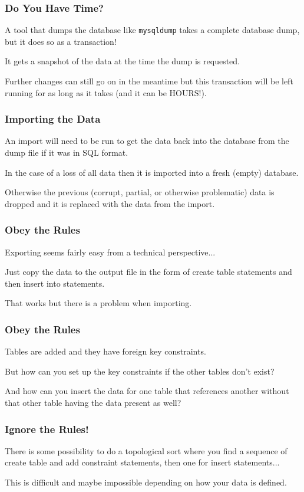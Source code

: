 \begin{frame}
\frametitle{Do You Have Time?}

A tool that dumps the database like \texttt{mysqldump} takes a complete database dump, but it does so as a transaction! 

It gets a snapshot of the data at the time the dump is requested.

Further changes can still go on in the meantime but this transaction will be left running for as long as it takes (and it can be HOURS!).


\end{frame}


\begin{frame}
\frametitle{Importing the Data}

An import will need to be run to get the data back into the database from the dump file if it was in SQL format. 

In the case of a loss of all data then it is imported into a fresh (empty) database.

Otherwise the previous (corrupt, partial, or otherwise problematic) data is dropped and it is replaced with the data from the import.


\end{frame}

\begin{frame}
\frametitle{Obey the Rules}

Exporting seems fairly easy from a technical perspective... 

Just copy the data to the output file in the form of create table statements and then insert into statements. 

That works but there is a problem when importing. 

\end{frame}

\begin{frame}
\frametitle{Obey the Rules}


Tables are added and they have foreign key constraints. 

But how can you set up the key constraints if the other tables don't exist? 

And how can you insert the data for one table that references another without that other table having the data present as well?
\end{frame}


\begin{frame}
\frametitle{Ignore the Rules!}

There is some possibility to do a topological sort where you find a sequence of create table and add constraint statements, then one for insert statements... 

This is difficult and maybe impossible depending on how your data is defined. 

\end{frame}


